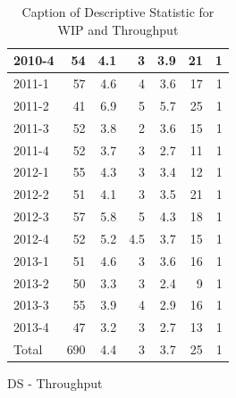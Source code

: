 \documentclass[UKenglish]{ifimaster}  %
\begin{document}
\begin{appendices}
\begin{table}[!htbp]
\begin{adjustwidth}{-2.5cm}{}
\begin{subfigure}[b]{0.3\textwidth}
{\begin{tabular}{ | l | r | r | r | r | r | r | }
 2010-4  & 54 & 4.1 & 3 & 3.9 & 21 & 1 \\ \hline
 2011-1  & 57 & 4.6 & 4 & 3.6 & 17 & 1 \\ \hline
 2011-2  & 41 & 6.9 & 5 & 5.7 & 25 & 1 \\ \hline
 2011-3  & 52 & 3.8 & 2 & 3.6 & 15 & 1 \\ \hline
 2011-4  & 52 & 3.7 & 3 & 2.7 & 11 & 1 \\ \hline
 2012-1  & 55 & 4.3 & 3 & 3.4 & 12 & 1 \\ \hline
 2012-2  & 51 & 4.1 & 3 & 3.5 & 21 & 1 \\ \hline
 2012-3  & 57 & 5.8 & 5 & 4.3 & 18 & 1 \\ \hline
 2012-4  & 52 & 5.2 & 4.5 & 3.7 & 15 & 1 \\ \hline
 2013-1  & 51 & 4.6 & 3 & 3.6 & 16 & 1 \\ \hline
 2013-2  & 50 & 3.3 & 3 & 2.4 & 9 & 1 \\ \hline
 2013-3  & 55 & 3.9 & 4 & 2.9 & 16 & 1 \\ \hline
 2013-4  & 47 & 3.2 & 3 & 2.7 & 13 & 1 \\ \hline
 Total & 690 & 4.4 & 3 & 3.7 & 25 & 1 \\ \hline

\end{tabular}
}
\caption{DS - Throughput}
 \label{DS:Throughput:2}
\end{subfigure}
\end{adjustwidth}
\caption[Optional caption for list of figures]{Caption of Descriptive Statistic for WIP and Throughput }
\label{DS:2:1} %
\end{table}




\end{appendices}
\end{document}
